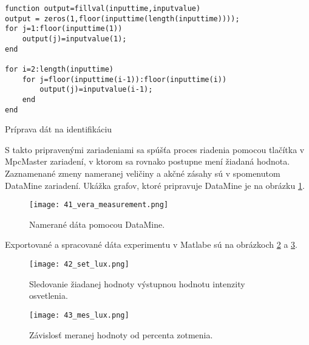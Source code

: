 \begin{algorithm}
%
\begin{lstlisting}
function output=fillval(inputtime,inputvalue)
output = zeros(1,floor(inputtime(length(inputtime))));
for j=1:floor(inputtime(1))
    output(j)=inputvalue(1);
end

for i=2:length(inputtime)
    for j=floor(inputtime(i-1)):floor(inputtime(i))
        output(j)=inputvalue(i-1);
    end
end
\end{lstlisting}
 \caption{Príprava dát na identifikáciu}
 \label{alg05}
\end{algorithm} 
 
S takto pripravenými zariadeniami sa spúšťa proces riadenia pomocou tlačítka v MpcMaster zariadení, v ktorom sa rovnako postupne mení žiadaná hodnota. Zaznamenané zmeny nameranej veličiny a akčné zásahy sú v spomenutom DataMine zariadení. Ukážka grafov, ktoré pripravuje DataMine je na obrázku  \ref{41_vera_measurement}.

\begin{figure}[!htbp]
\centering
\texttt{[image: 41\_vera\_measurement.png]}
\caption{Namerané dáta pomocou DataMine.}
\label{41_vera_measurement}
\end{figure}

Exportované a spracované dáta experimentu v Matlabe sú na obrázkoch \ref{42_set_lux} a \ref{43_mes_lux}.


\begin{figure}[!htbp]
\centering
\texttt{[image: 42\_set\_lux.png]}
\caption{Sledovanie žiadanej hodnoty výstupnou hodnotu intenzity osvetlenia.}
\label{42_set_lux}
\end{figure}


\begin{figure}[!htbp]
\centering
\texttt{[image: 43\_mes\_lux.png]}
\caption{Závislosť meranej hodnoty od percenta zotmenia.}
\label{43_mes_lux}
\end{figure}

